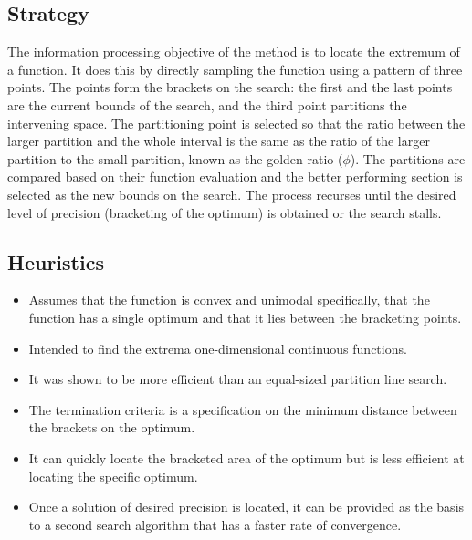 \subsection{Strategy}
The information processing objective of the method is to locate the extremum of a function.
It does this by directly sampling the function using a pattern of three points. The points form the brackets on the search: the first and the last points are the current bounds of the search, and the third point partitions the intervening space. The partitioning point is selected so that the ratio between the larger partition and the whole interval is the same as the ratio of the larger partition to the small partition, known as the golden ratio ($\phi$). The partitions are compared based on their function evaluation and the better performing section is selected as the new bounds on the search. The process recurses until the desired level of precision (bracketing of the optimum) is obtained or the search stalls.

\subsection{Heuristics}

\begin{itemize}
	\item Assumes that the function is convex and unimodal specifically, that the function has a single optimum and that it lies between the bracketing points.
	\item Intended to find the extrema one-dimensional continuous functions.
	\item It was shown to be more efficient than an equal-sized partition line search.
	\item The termination criteria is a specification on the minimum distance between the brackets on the optimum.
	\item It can quickly locate the bracketed area of the optimum but is less efficient at locating the specific optimum.
	\item Once a solution of desired precision is located, it can be provided as the basis to a second search algorithm that has a faster rate of convergence.
\end{itemize}

